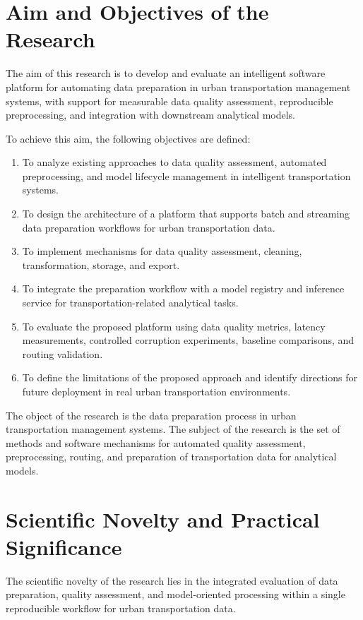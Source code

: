 \section{Aim and Objectives of the Research}
\label{sec:objectives}

The aim of this research is to develop and evaluate an intelligent software platform for automating data preparation in urban transportation management systems, with support for measurable data quality assessment, reproducible preprocessing, and integration with downstream analytical models.

To achieve this aim, the following objectives are defined:
\begin{enumerate}
  \item To analyze existing approaches to data quality assessment, automated preprocessing, and model lifecycle management in intelligent transportation systems.
  \item To design the architecture of a platform that supports batch and streaming data preparation workflows for urban transportation data.
  \item To implement mechanisms for data quality assessment, cleaning, transformation, storage, and export.
  \item To integrate the preparation workflow with a model registry and inference service for transportation-related analytical tasks.
  \item To evaluate the proposed platform using data quality metrics, latency measurements, controlled corruption experiments, baseline comparisons, and routing validation.
  \item To define the limitations of the proposed approach and identify directions for future deployment in real urban transportation environments.
\end{enumerate}

The object of the research is the data preparation process in urban transportation management systems. The subject of the research is the set of methods and software mechanisms for automated quality assessment, preprocessing, routing, and preparation of transportation data for analytical models.

\section{Scientific Novelty and Practical Significance}

The scientific novelty of the research lies in the integrated evaluation of data preparation, quality assessment, and model-oriented processing within a single reproducible workflow for urban transportation data.


